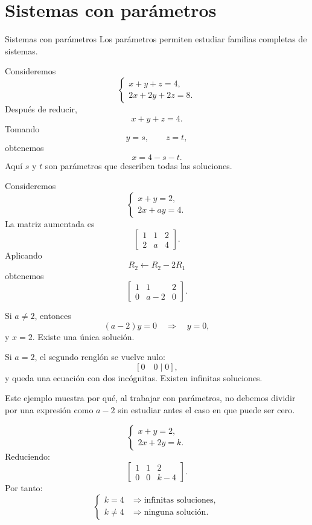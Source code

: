 \documentclass[aspectratio=169,9pt]{beamer}
\theoremstyle{remark}
\begin{document}
\section{Sistemas con parámetros}
\begin{frame}[allowframebreaks,t]{Sistemas con parámetros}
Los parámetros permiten estudiar familias completas de sistemas.

\par{}\par\smallskip

Consideremos
\[
\begin{cases}
x+y+z=4,\\
2x+2y+2z=8.
\end{cases}
\]
Después de reducir,
\[
x+y+z=4.
\]
Tomando
\[
y=s,\qquad z=t,
\]
obtenemos
\[
x=4-s-t.
\]
Aquí $s$ y $t$ son parámetros que describen todas las soluciones.

\par{}\par\smallskip

Consideremos
\[
\begin{cases}
x+y=2,\\
2x+ay=4.
\end{cases}
\]
La matriz aumentada es
\[
\left[
\begin{array}{cc|c}
1&1&2\\
2&a&4
\end{array}
\right].
\]
Aplicando
\[
R_2\leftarrow R_2-2R_1
\]
obtenemos
\[
\left[
\begin{array}{cc|c}
1&1&2\\
0&a-2&0
\end{array}
\right].
\]

Si $a\neq2$, entonces
\[
(a-2)y=0\quad\Longrightarrow\quad y=0,
\]
y $x=2$. Existe una única solución.

Si $a=2$, el segundo renglón se vuelve nulo:
\[
[0\quad0\mid0],
\]
y queda una ecuación con dos incógnitas. Existen infinitas soluciones.

Este ejemplo muestra por qué, al trabajar con parámetros, no debemos dividir por una expresión como
$a-2$ sin estudiar antes el caso en que puede ser cero.

\par{}\par\smallskip

\[
\begin{cases}
x+y=2,\\
2x+2y=k.
\end{cases}
\]
Reduciendo:
\[
\left[
\begin{array}{cc|c}
1&1&2\\
0&0&k-4
\end{array}
\right].
\]
Por tanto:
\[
\begin{cases}
k=4 &\Longrightarrow \text{infinitas soluciones},\\
k\neq4 &\Longrightarrow \text{ninguna solución}.
\end{cases}
\]
\end{frame}
\end{document}
